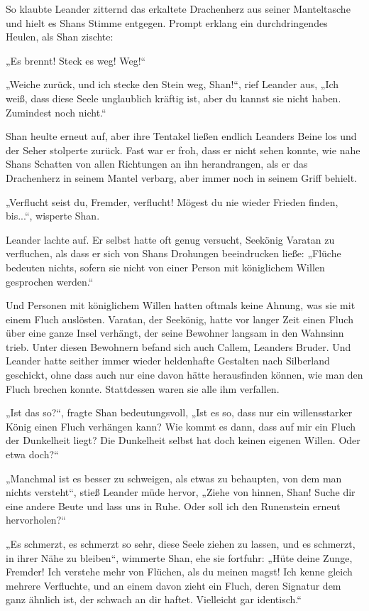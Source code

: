 \documentclass[10pt, a4paper, oneside]{book}
\begin{document}
So klaubte Leander zitternd das erkaltete Drachenherz aus seiner Manteltasche und hielt es Shans Stimme entgegen. Prompt erklang ein durchdringendes Heulen, als Shan zischte:

„Es brennt! Steck es weg! Weg!“

„Weiche zurück, und ich stecke den Stein weg, Shan!“, rief Leander aus, „Ich weiß, dass diese Seele unglaublich kräftig ist, aber du kannst sie nicht haben. Zumindest noch nicht.“

Shan heulte erneut auf, aber ihre Tentakel ließen endlich Leanders Beine los und der Seher stolperte zurück. Fast war er froh, dass er nicht sehen konnte, wie nahe Shans Schatten von allen Richtungen an ihn herandrangen, als er das Drachenherz in seinem Mantel verbarg, aber immer noch in seinem Griff behielt.

„Verflucht seist du, Fremder, verflucht! Mögest du nie wieder Frieden finden, bis...“, wisperte Shan.

Leander lachte auf. Er selbst hatte oft genug versucht, Seekönig Varatan zu verfluchen, als dass er sich von Shans Drohungen beeindrucken ließe: „Flüche bedeuten nichts, sofern sie nicht von einer Person mit königlichem Willen gesprochen werden.“

Und Personen mit königlichem Willen hatten oftmals keine Ahnung, was sie mit einem Fluch auslösten. Varatan, der Seekönig, hatte vor langer Zeit einen Fluch über eine ganze Insel verhängt, der seine Bewohner langsam in den Wahnsinn trieb. Unter diesen Bewohnern befand sich auch Callem, Leanders Bruder. Und Leander hatte seither immer wieder heldenhafte Gestalten nach Silberland geschickt, ohne dass auch nur eine davon hätte herausfinden können, wie man den Fluch brechen konnte. Stattdessen waren sie alle ihm verfallen.

„Ist das so?“, fragte Shan bedeutungsvoll, „Ist es so, dass nur ein willensstarker König einen Fluch verhängen kann? Wie kommt es dann, dass auf mir ein Fluch der Dunkelheit liegt? Die Dunkelheit selbst hat doch keinen eigenen Willen. Oder etwa doch?“

„Manchmal ist es besser zu schweigen, als etwas zu behaupten, von dem man nichts versteht“, stieß Leander müde hervor, „Ziehe von hinnen, Shan! Suche dir eine andere Beute und lass uns in Ruhe. Oder soll ich den Runenstein erneut hervorholen?“

„Es schmerzt, es schmerzt so sehr, diese Seele ziehen zu lassen, und es schmerzt, in ihrer Nähe zu bleiben“, wimmerte Shan, ehe sie fortfuhr: „Hüte deine Zunge, Fremder! Ich verstehe mehr von Flüchen, als du meinen magst! Ich kenne gleich mehrere Verfluchte, und an einem davon zieht ein Fluch, deren Signatur dem ganz ähnlich ist, der schwach an dir haftet. Vielleicht gar identisch.“
\end{document}
